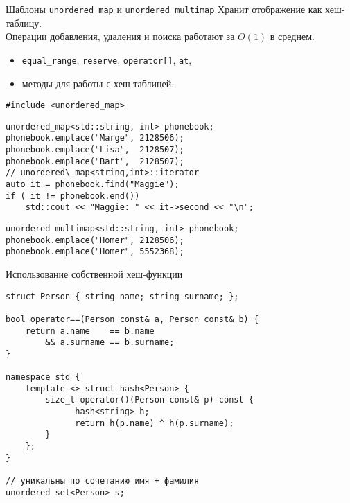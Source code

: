\documentclass[aspectration=1610,t]{beamer}
\begin{document}
\begin{frame}[fragile]{Шаблоны {\tt unordered\_map} и {\tt unordered\_multimap}}
Хранит отображение как хеш-таблицу.\\ 
Операции добавления, удаления и поиска работают за $O(1)$ в среднем.

\begin{itemize}
	\item {\tt equal\_range}, {\tt reserve}, {\tt operator[]}, {\tt at},
	\item методы для работы с хеш-таблицей.
\end{itemize}\vspace{-1mm}
\begin{lstlisting}
#include <unordered_map>
\end{lstlisting}\vspace{-1mm}
\begin{lstlisting}
unordered_map<std::string, int> phonebook;
phonebook.emplace("Marge", 2128506);
phonebook.emplace("Lisa",  2128507);
phonebook.emplace("Bart",  2128507);
// unordered\_map<string,int>::iterator
auto it = phonebook.find("Maggie");
if ( it != phonebook.end())
    std::cout << "Maggie: " << it->second << "\n";
\end{lstlisting}\vspace{-1mm}
\begin{lstlisting}
unordered_multimap<std::string, int> phonebook;
phonebook.emplace("Homer", 2128506);
phonebook.emplace("Homer", 5552368);
\end{lstlisting}
\end{frame}

\begin{frame}[fragile]{Использование собственной хеш-функции}
\begin{lstlisting}
struct Person { string name; string surname; };

bool operator==(Person const& a, Person const& b) { 		
    return a.name    == b.name 
        && a.surname == b.surname; 
}

namespace std {
    template <> struct hash<Person> {
        size_t operator()(Person const& p) const {
              hash<string> h;
              return h(p.name) ^ h(p.surname);
        }
    };
}

// уникальны по сочетанию имя + фамилия
unordered_set<Person> s;
\end{lstlisting}
\end{frame}


%
%
%


\end{document}
